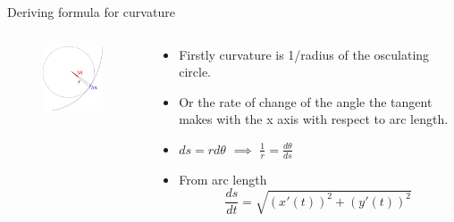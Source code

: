 \documentclass{beamer}
\begin{document}
\begin{frame}{Deriving formula for curvature}
	\begin{columns}
		\begin{column}{0.4\textwidth}
			\begin{figure}
				\centering
				\includegraphics[width=50mm, scale=0.4]{curvature_illustration.png}
			\end{figure}
		\end{column}
		\begin{column}{0.6\textwidth}
			\begin{itemize}
				\item Firstly curvature is 1/radius of the osculating circle.
				\item Or the rate of change of the angle the tangent makes with the x axis with respect to arc length.
				\item $ds=rd\theta$ $\implies$ $\frac{1}{r}=\frac{d\theta}{ds}$
				
				\item From arc length 
				\begin{equation} \label{eq:1}
					\frac{ds}{dt} = \sqrt{(x'(t))^2+(y'(t))^2} 
				\end{equation}
				
				
			
			\end{itemize}
			
			
			
		\end{column}
	\end{columns}

	
\end{frame}
\end{document}

